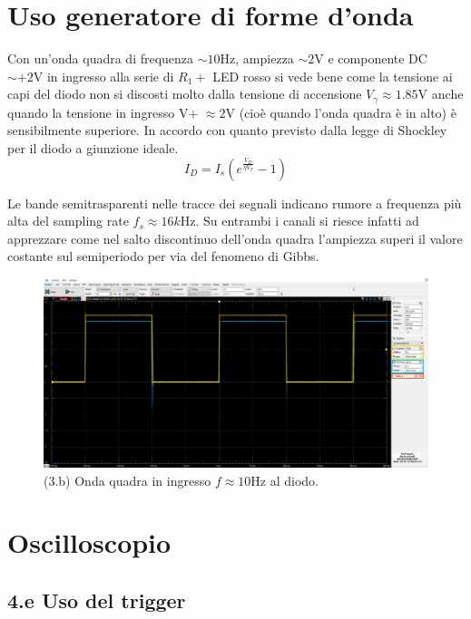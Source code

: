 \documentclass[10pt,a4paper]{article}
\begin{document}
\section{Uso generatore di forme d'onda}
Con un'onda quadra di frequenza $\sim 10 \si{\Hz}$, ampiezza $\sim 2 \si{\V}$
e componente DC $\sim + 2 \si{\V}$ in ingresso alla serie di $R_1 +$ LED
rosso si vede bene come la tensione ai capi del diodo non si discosti
molto dalla tensione di accensione $V_\gamma \approx 1.85 \si{\V}$ anche
quando la tensione in ingresso V+ $\approx 2 \si{\V}$ (cioè quando l'onda
quadra è in alto) è sensibilmente superiore. In accordo con quanto previsto
dalla legge di Shockley per il diodo a giunzione ideale.
\begin{equation}\label{eq:shockley}
I_D = I_s \left(e^{\frac{V_D}{\eta V_T}} - 1 \right)
\end{equation}

Le bande semitrasparenti nelle tracce dei segnali indicano rumore a frequenza
più alta del sampling rate $f_s \approx 16 \si{k\Hz}$. Su entrambi i canali
si riesce infatti ad apprezzare come nel salto discontinuo dell'onda quadra
l'ampiezza superi il valore costante sul semiperiodo per via del fenomeno di
Gibbs. 

\begin{figure}[htb]
\centering
\includegraphics[scale=0.3]{sqwdiode}
\caption{(3.b) Onda quadra in ingresso $f \approx 10 \si{\Hz}$ al diodo.}
\end{figure}
\section{Oscilloscopio}

\subsection*{4.e Uso del trigger}
\end{document}

